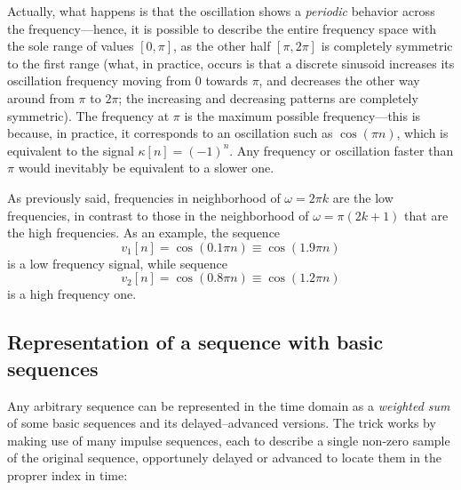 \documentclass[\documentfontsize, twocolumn]{\classname}
\begin{document}
Actually, what happens is that the oscillation shows a \emph{periodic} behavior across the frequency---hence, it is possible to describe the entire frequency space with the sole range of values $[0, \pi]$, as the other half $[\pi, 2\pi]$ is completely symmetric to the first range (what, in practice, occurs is that a discrete sinusoid increases its oscillation frequency moving from $0$ towards $\pi$, and decreases the other way around from $\pi$ to $2\pi$; the increasing and decreasing patterns are completely symmetric). The frequency at $\pi$ is the maximum possible frequency---this is because, in practice, it corresponds to an oscillation such as $\cos{(\pi n)}$, which is equivalent to the signal $\kappa[n] = (-1)^n$. Any frequency or oscillation faster than $\pi$ would inevitably be equivalent to a slower one.

As previously said, frequencies in neighborhood of $\omega = 2 \pi k$ are the low frequencies, in contrast to those in the neighborhood of $\omega = \pi (2k + 1)$ that are the high frequencies. As an example, the se\-quen\-ce 
\[
    v_1[n] = \cos{(0.1 \pi n)} \equiv \cos{(1.9\pi n)}
\] 
is a low frequency signal, while se\-quen\-ce 
\[
    v_2[n] = \cos{(0.8 \pi n)} \equiv \cos{(1.2\pi n)}
\] 
is a high frequency one. 

\subsection{Representation of a se\-quen\-ce with basic se\-quen\-ces}

Any arbitrary se\-quen\-ce can be represented in the time domain as a \emph{weighted sum} of some basic se\-quen\-ces and its delayed--advanced versions. The trick works by making use of many impulse sequences, each to describe a single non-zero sample of the original sequence, opportunely delayed or advanced to locate them in the proprer index in time:
\end{document}
